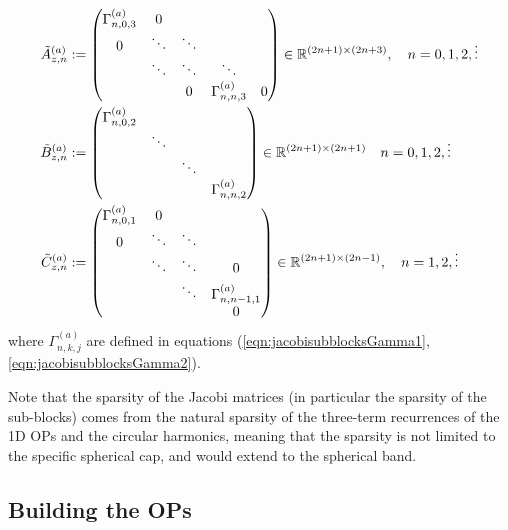 \documentclass[11pt, oneside]{article}   	%
\begin{document}
\begin{align*}
	\tilde A^{(a)}_{z,n} &:= 
		\begin{pmatrix}
			\Gamma^{(a)}_{n,0,3} & 0 & \\
			0 & \ddots & \ddots & & \\
			& \ddots & \ddots & \ddots & \\
			& & 0 & \Gamma^{(a)}_{n,n,3} & 0 \\
		\end{pmatrix} \in \mathbb{R}^{(2n+1)\times(2n+3)}, \quad n = 0,1,2,\vdots \\
	\tilde B^{(a)}_{z,n} &:= 
		\begin{pmatrix}
			\Gamma^{(a)}_{n,0,2} & \\
			& \ddots & & \\
			& & \ddots & \\
			& & & \Gamma^{(a)}_{n,n,2}
		\end{pmatrix} \in \mathbb{R}^{(2n+1)\times(2n+1)}  \quad n = 0,1,2,\vdots \\
	\tilde C^{(a)}_{z,n} &:= 
		\begin{pmatrix}
			\Gamma^{(a)}_{n,0,1} & 0 & & \\
			0 & \ddots & \ddots & \\
			& \ddots & \ddots & 0 \\
			& & \ddots & \Gamma^{(a)}_{n,n-1,1} \\
			& & & 0 \\
		\end{pmatrix} \in \mathbb{R}^{(2n+1)\times(2n-1)}, \quad n = 1,2,\vdots
\end{align*}
where $\Gamma^{(a)}_{n,k,j}$ are defined in equations (\ref{eqn:jacobisubblocksGamma1}, \ref{eqn:jacobisubblocksGamma2}). 

Note that the sparsity of the Jacobi matrices (in particular the sparsity of the sub-blocks) comes from the natural sparsity of the three-term recurrences of the 1D OPs and the circular harmonics, meaning that the sparsity is not limited to the specific spherical cap, and would extend to the spherical band.



\subsection{Building the OPs} 
\end{document}
